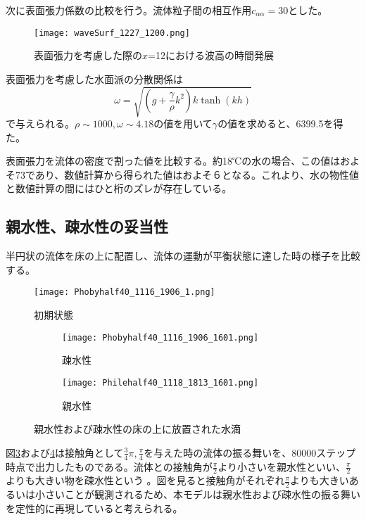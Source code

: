\documentclass[]{jsarticle}
\begin{document}
次に表面張力係数の比較を行う。流体粒子間の相互作用$c_{\alpha\alpha}=30$とした。
\begin{figure}[H]
  \centering
  \texttt{[image: waveSurf\_1227\_1200.png]}
  \caption{表面張力を考慮した際の$x$=12における波高の時間発展}
  \label{fig:waveSurfEvolwithSurfTension}
\end{figure}

表面張力を考慮した水面派の分散関係は
\begin{equation}
\omega=\sqrt{\left(g+\frac{\gamma}{\rho}k^2 \right)k \tanh (kh)}
\end{equation}
で与えられる\cite{tatsumiKiso}。$\rho\sim1000, \omega\sim4.18$の値を用いて$\gamma$の値を求めると、6399.5を得た。

表面張力を流体の密度で割った値を比較する。約18℃の水の場合、この値はおよそ73であり、数値計算から得られた値はおよそ６となる。これより、水の物性値と数値計算の間にはひと桁のズレが存在している。


\subsection{親水性、疎水性の妥当性}
\label{subsec:validity}

半円状の流体を床の上に配置し、流体の運動が平衡状態に達した時の様子を比較する。
\begin{figure}[H]
  \centering
  \texttt{[image: Phobyhalf40\_1116\_1906\_1.png]}
  \caption{初期状態}
  \label{fig:contactInitial}
\end{figure}

\begin{figure}[H]
  \centering
  \begin{subfigure}{0.8\columnwidth}
    \centering
    \texttt{[image: Phobyhalf40\_1116\_1906\_1601.png]}
    \caption{疎水性}
    \label{fig:PhobyDrop}
  \end{subfigure}
  \begin{subfigure}{0.8\columnwidth}
    \centering
    \texttt{[image: Philehalf40\_1118\_1813\_1601.png]}
    \caption{親水性}
    \label{fig:PhileDrop}
  \end{subfigure}
  \caption{親水性および疎水性の床の上に放置された水滴}
  \label{fig:contactAngles}
\end{figure}

図\ref{fig:PhobyDrop}および\ref{fig:PhileDrop}は接触角として$\frac{3}{4}\pi, \frac{\pi}{4}$を与えた時の流体の振る舞いを、80000ステップ時点で出力したものである。流体との接触角が$\frac{\pi}{2}$より小さいを親水性といい、$\frac{\pi}{2}$よりも大きい物を疎水性という \cite{Law2014}。図を見ると接触角がそれぞれ$\frac{\pi}{2}$よりも大きいあるいは小さいことが観測されるため、本モデルは親水性および疎水性の振る舞いを定性的に再現していると考えられる。
\end{document}
